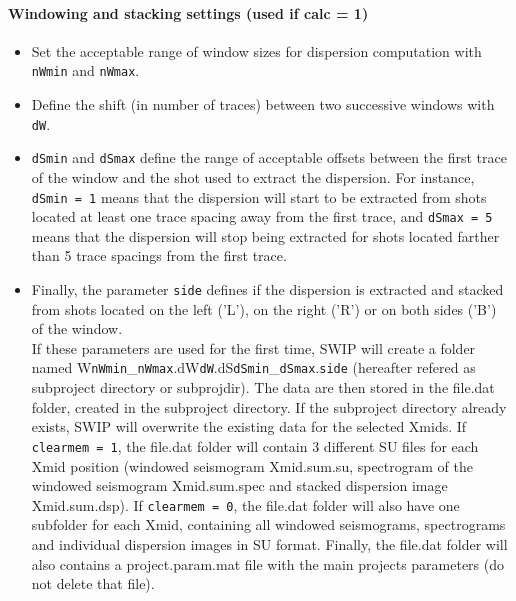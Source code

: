 \documentclass[twoside,a4paper]{article}
\begin{document}
\paragraph{Windowing and stacking settings (used if calc = 1)}
\begin{itemize}
\setlength\itemsep{2ex}
\setlength{\parindent}{5ex}

\item Set the acceptable range of window sizes for dispersion computation with \verb|nWmin| and \verb|nWmax|.

\item Define the shift (in number of traces) between two successive windows with \verb|dW|.

\item \verb|dSmin| and \verb|dSmax| define the range of acceptable offsets between the first trace of the window and the shot used to extract the dispersion. For instance, \verb|dSmin = 1| means that the dispersion will start to be extracted from shots located at least one trace spacing away from the first trace, and \verb|dSmax = 5| means that the dispersion will stop being extracted for shots located farther than 5 trace spacings from the first trace.

\item Finally, the parameter \verb|side| defines if the dispersion is extracted and stacked from shots located on the left ('L'), on the right ('R') or on both sides ('B') of the window.\\[2ex]
%
If these parameters are used for the first time, SWIP will create a folder named W\verb|nWmin|\_\verb|nWmax|.dW\verb|dW|.dS\verb|dSmin|\_\verb|dSmax|.\verb|side| (hereafter refered as subproject directory or subprojdir). The data are then stored in the file.dat folder, created in the subproject directory. If the subproject directory already exists, SWIP will overwrite the existing data for the selected Xmids. If \verb|clearmem = 1|, the file.dat folder will contain 3 different SU files for each Xmid position (windowed seismogram Xmid.sum.su, spectrogram of the windowed seismogram Xmid.sum.spec and stacked dispersion image Xmid.sum.dsp). If \verb|clearmem = 0|, the file.dat folder will also have one subfolder for each Xmid, containing all windowed seismograms, spectrograms and individual dispersion images in SU format. Finally, the file.dat folder will also contains a project.param.mat file with the main projects parameters (do not delete that file).
\end{itemize}
\end{document}
